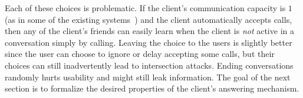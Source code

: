 Each of these choices is problematic. 
If the client's communication capacity is $1$ (as in some of the existing
  systems~\cite{vandenhoof15vuvuzela, tyagi17stadium}) and the client 
  automatically accepts calls, then any of the client's friends can easily 
  learn when the client is \emph{not} active in a conversation simply by 
  calling.
Leaving the choice to the users is slightly better since the user can choose to 
  ignore or delay accepting some calls, but their choices can still 
  inadvertently lead to intersection attacks.
Ending conversations randomly hurts usability and might still leak information.
The goal of the next section is to formalize the desired properties of 
  the client's answering mechanism.
